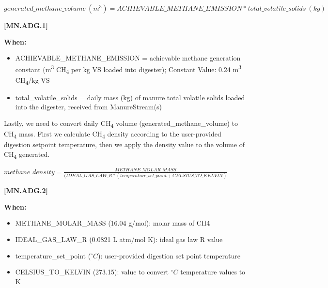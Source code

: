 \begin{refsection}
    \begin{center}
\(generated\_methane\_volume\ (m^3) = ACHIEVABLE\_METHANE\_EMISSION * total\_volatile\_solids\ (kg)  \)
    \end{center}
        \vspace{0.5cm} 
    
            {\raggedleft \textbf{[MN.ADG.1]}\par}
            \vspace{0.5cm}

\textbf{When:}
    \begin{itemize}
        \item ACHIEVABLE\_METHANE\_EMISSION = achievable methane generation constant (m\textsuperscript{3} CH\textsubscript{4} per kg VS loaded into digester); Constant Value: 0.24 m\textsuperscript{3} CH\textsubscript{4}/kg VS
        \item total\_volatile\_solids = daily mass (kg) of manure total volatile solids loaded into the digester, received from ManureStream(s)

    \end{itemize}
    \vspace{0.2cm}

Lastly, we need to convert daily CH\textsubscript{4} volume (generated\_methane\_volume) to CH\textsubscript{4} mass. First we calculate CH\textsubscript{4} density according to the user-provided digestion setpoint temperature, then we apply the density value to the volume of CH\textsubscript{4} generated.
         \vspace{0.2cm}

    \begin{center}
\(methane\_density = \frac{METHANE\_MOLAR\_MASS}{(IDEAL\_GAS\_LAW\_R * (temperature\_set\_point + CELSIUS\_TO\_KELVIN)} \)
    \end{center}
        \vspace{0.5cm} 
    
            {\raggedleft \textbf{[MN.ADG.2]}\par}
            \vspace{0.5cm}

\textbf{When:}
    \begin{itemize}
        \item METHANE\_MOLAR\_MASS (16.04 g/mol): molar mass of CH4
        \item IDEAL\_GAS\_LAW\_R (0.0821 L atm/mol K): ideal gas law R value 
        \item temperature\_set\_point (\(^\circ C\)): user-provided digestion set point temperature
        \item CELSIUS\_TO\_KELVIN (273.15): value to convert \(^\circ C\) temperature values to K



\end{itemize}
\end{refsection}
